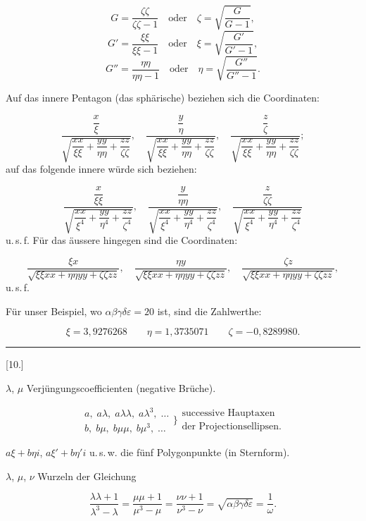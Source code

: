 \[
G = \frac{\zeta\zeta}{\zeta\zeta-1} \quad \text{oder} \quad \zeta = \sqrt{\frac{G}{G-1}},
\]
\[
G' = \frac{\xi\xi}{\xi\xi-1} \quad \text{oder} \quad \xi = \sqrt{\frac{G'}{G'-1}},
\]
\[
G'' = \frac{\eta\eta}{\eta\eta-1} \quad \text{oder} \quad \eta = \sqrt{\frac{G''}{G''-1}}.
\]

Auf das innere Pentagon (das sphärische) beziehen sich die Coordinaten:

\[
\frac{\dfrac{x}{\xi}}{\sqrt{\dfrac{xx}{\xi\xi}+\dfrac{yy}{\eta\eta}+\dfrac{zz}{\zeta\zeta}}}, \quad
\frac{\dfrac{y}{\eta}}{\sqrt{\dfrac{xx}{\xi\xi}+\dfrac{yy}{\eta\eta}+\dfrac{zz}{\zeta\zeta}}}, \quad
\frac{\dfrac{z}{\zeta}}{\sqrt{\dfrac{xx}{\xi\xi}+\dfrac{yy}{\eta\eta}+\dfrac{zz}{\zeta\zeta}}};
\]
auf das folgende innere würde sich beziehen:

\[
\frac{\dfrac{x}{\xi\xi}}{\sqrt{\dfrac{xx}{\xi^4}+\dfrac{yy}{\eta^4}+\dfrac{zz}{\zeta^4}}}, \quad
\frac{\dfrac{y}{\eta\eta}}{\sqrt{\dfrac{xx}{\xi^4}+\dfrac{yy}{\eta^4}+\dfrac{zz}{\zeta^4}}}, \quad
\frac{\dfrac{z}{\zeta\zeta}}{\sqrt{\dfrac{xx}{\xi^4}+\dfrac{yy}{\eta^4}+\dfrac{zz}{\zeta^4}}}
\]
u.\,s.\,f. Für das äussere hingegen sind die Coordinaten:

\[
\frac{\xi x}{\sqrt{\xi\xi xx+\eta\eta yy+\zeta\zeta zz}}, \quad
\frac{\eta y}{\sqrt{\xi\xi xx+\eta\eta yy+\zeta\zeta zz}}, \quad
\frac{\zeta z}{\sqrt{\xi\xi xx+\eta\eta yy+\zeta\zeta zz}},
\]
u.\,s.\,f.

Für unser Beispiel, wo $\alpha\beta\gamma\delta\varepsilon = 20$ ist, sind die Zahlwerthe:

\[
\xi = 3{,}9276268 \qquad \eta = 1{,}3735071 \qquad \zeta = -0{,}8289980.
\]

\begin{center}\rule{3cm}{.4pt}\end{center}

\begin{center}[10.]\end{center}

$\lambda$, $\mu$ Verjüngungscoefficienten (negative Brüche).

\[
\begin{aligned}
a,\; a\lambda,\; a\lambda\lambda,\; a\lambda^3,\; \ldots \\
b,\; b\mu,\; b\mu\mu,\; b\mu^3,\; \ldots
\end{aligned}
\Bigg\} \begin{gathered}\text{successive Hauptaxen}\\\text{der Projectionsellipsen.}\end{gathered}
\]

$a\xi+b\eta i$, $a\xi'+b\eta' i$ u.\,s.\,w. die fünf Polygonpunkte (in Sternform).

$\lambda$, $\mu$, $\nu$ Wurzeln der Gleichung

\[
\frac{\lambda\lambda+1}{\lambda^3-\lambda} = \frac{\mu\mu+1}{\mu^3-\mu} = \frac{\nu\nu+1}{\nu^3-\nu} = \sqrt{\alpha\beta\gamma\delta\varepsilon} = \frac{1}{\omega}.
\]
